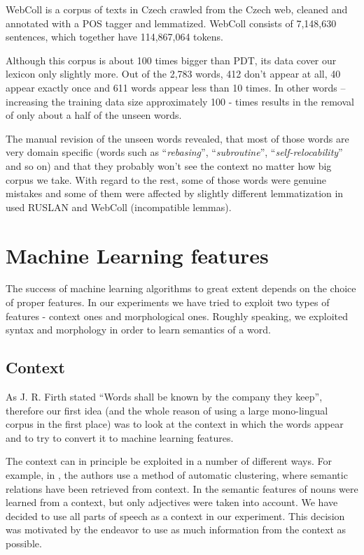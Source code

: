 \documentclass[letterpaper]{article}
\begin{document}
WebColl\cite{webcoll} is a corpus of texts in Czech crawled from the Czech web, cleaned and annotated  with a POS tagger and lemmatized.
WebColl consists of 7,148,630 sentences, which together have 114,867,064 tokens. 

Although this corpus is about 100 times bigger than PDT, its data cover our lexicon only slightly more. Out of the 2,783 words, 412 don't appear at all, 
40 appear exactly once and 611 words appear less than 10 times. In other words -- increasing the training data size approximately 100 - times results in the removal of only about a half of the unseen words.

The manual revision of the unseen words revealed, that most of those words are very domain specific 
(words such as ``\emph{rebasing}'', ``\emph{subroutine}'', ``\emph{self-relocability}'' and so on) 
and that they probably won't see the context no matter how big corpus we take. With regard to the rest, some of those words were genuine mistakes and some of them were affected by slightly different lemmatization in used RUSLAN and WebColl (incompatible lemmas).


\section{Machine Learning features}
The success of machine learning algorithms to great extent depends on the 
choice of proper 
features.
In our experiments we have tried to exploit two types of features 
- context ones and morphological ones. 
Roughly speaking, we exploited syntax and morphology in order to learn semantics of a word.  

\subsection{Context}
As J. R. Firth stated ``Words shall be known by the company they keep'',
therefore our first idea (and the whole reason of using a large mono-lingual corpus in the first place) 
was to look at the context in which the words appear and to try to convert it to machine learning features.

The context can in principle be exploited in a number of different ways. For example, in \cite{baroni:2009}, the authors use a method of automatic clustering,  
where semantic relations have been retrieved from context. 
In \cite{biemann05} the semantic features of nouns were learned
from a context, but only adjectives were taken into account.
We have decided to use all parts of speech as a context in our experiment. This decision was motivated by the endeavor to use as much information from the context as possible. 
\end{document}
